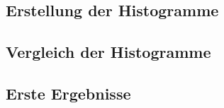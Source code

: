\subsection{Erstellung der Histogramme}

\subsection{Vergleich der Histogramme}

\subsection{Erste Ergebnisse}